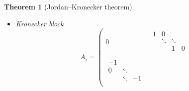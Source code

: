 \documentclass[12pt]{article}
\newtheorem{theorem}[lemma]{Theorem}
\theoremstyle{definition}
\begin{document}
\begin{theorem}[Jordan--Kronecker theorem]
\begin{itemize}
{\begin{equation}
\begin{array}{c|c}
\begin{matrix}
      &1 &  &     \\
      &        & \ddots &   \\
      &        &        & 1   \\
    \end{matrix} \\
  \hline
  \begin{matrix}
  \minus1  &        &   & \\
     & \minus1 &     &\\
      &  & \ddots &  \\
      &        &    & \minus1 \\
  \end{matrix} & 0
 \end{array}
 \right)
\quad B_i = \left(
\begin{array}{c|c}
  0 & \begin{matrix}
    0 & 1&        & \\
      & 0 & \ddots &     \\
      &        & \ddots & 1  \\
      &        &        & 0   \\
    \end{matrix} \\
  \hline
  \begin{matrix}
  0  &        &   & \\
  \minus1   & 0 &     &\\
      & \ddots & \ddots &  \\
      &        & \minus1   & 0 \\
  \end{matrix} & 0
 \end{array}
 \right)
 \end{equation} } \item   Kronecker block {\scriptsize \begin{equation} \label{Eq:KronBlock} A_i = \left(
\begin{array}{c|c}
  0 & \begin{matrix}
   1 & 0      &        &     \\
      & \ddots & \ddots &     \\
      &        & 1    &  0  \\
    \end{matrix} \\
  \hline
  \begin{matrix}
  \minus1  &        &    \\
  0   & \ddots &    \\
      & \ddots & \minus1 \\

\end{matrix}
\end{array}
\end{equation}}
\end{itemize}
\end{theorem}
\end{document}

